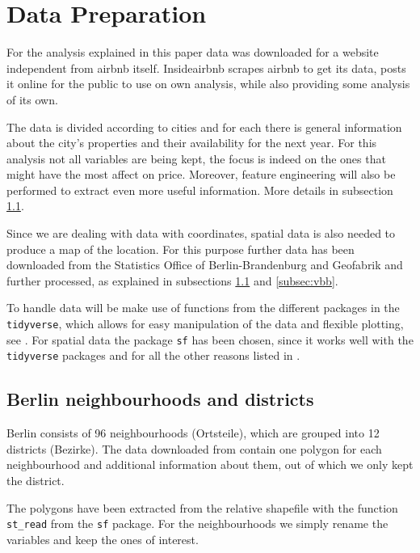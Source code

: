 \section{Data Preparation}\label{Sec:Data Preparation}

For the analysis explained in this paper data was downloaded for a website independent from airbnb itself. Insideairbnb \citep{insideairbnb} scrapes airbnb to get its data, posts it online for the public to use on own analysis, while also providing some analysis of its own.

The data is divided according to cities and for each there is general information about the city's properties and their availability for the next year. For this analysis not all variables are being kept, the focus is indeed on the ones that might have the most affect on price. Moreover, feature engineering will also be performed to extract even more useful information. More details in subsection \ref{subsec:berlin}.

Since we are dealing with data with coordinates, spatial data is also needed to produce a map of the location. For this purpose further data has been downloaded from the Statistics Office of Berlin-Brandenburg \citep{statberlin:2018} and Geofabrik \citep{geofabrik:2018} and further processed, as explained in subsections \ref{subsec:berlin} and \ref{subsec:vbb}.

To handle data will be make use of functions from the different packages in the \texttt{tidyverse}, which allows for easy manipulation of the data and flexible plotting, see \cite{ross2017declutter}. For spatial data the package \texttt{sf} has been chosen, since it works well with the \texttt{tidyverse} packages and for all the other reasons listed in \cite{pebesma2018simple}.


\subsection{Berlin neighbourhoods and districts}\label{subsec:berlin}

Berlin consists of 96 neighbourhoods (Ortsteile), which are grouped into 12 districts (Bezirke). The data downloaded from  \cite{statberlin:2018} contain one polygon for each neighbourhood and additional information about them, out of which we only kept the district.

The polygons have been extracted from the relative shapefile with the function \texttt{st\_read} from the \texttt{sf} package. For the neighbourhoods we simply rename the variables and keep the ones of interest.

